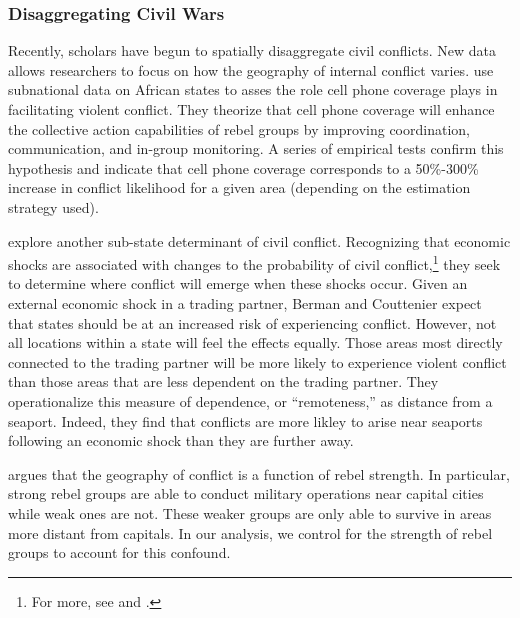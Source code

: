 \subsubsection{Disaggregating Civil Wars}

Recently, scholars have begun to spatially disaggregate civil conflicts. New data allows researchers to focus on how the geography of internal conflict varies. \cite{pierskalla:hollenbach:2013} use subnational data on African states to asses the role cell phone coverage plays in facilitating violent conflict. They theorize that cell phone coverage will enhance the collective action capabilities of rebel groups by improving coordination, communication, and in-group monitoring. A series of empirical tests confirm this hypothesis and indicate that cell phone coverage corresponds to a 50\%-300\% increase in conflict likelihood for a given area (depending on the estimation strategy used).

\cite{berman:couttenier:2013} explore another sub-state determinant of civil conflict. Recognizing that economic shocks are associated with changes to the probability of civil conflict,\footnote{For more, see \cite{miguel:etal:2004} and \cite{dube:vargas:2013}.} they seek to determine where conflict will emerge when these shocks occur. Given an external economic shock in a trading partner, Berman and Couttenier expect that states should be at an increased risk of experiencing conflict. However, not all locations within a state will feel the effects equally. Those areas most directly connected to the trading partner will be more likely to experience violent conflict than those areas that are less dependent on the trading partner. They operationalize this measure of dependence, or ``remoteness,'' as distance from a seaport. Indeed, they find that conflicts are more likley to arise near seaports following an economic shock than they are further away.

\cite{buhaug:2010} argues that the geography of conflict is a function of rebel strength. In particular, strong rebel groups are able to conduct military operations near capital cities while weak ones are not. These weaker groups are only able to survive in areas more distant from capitals. In our analysis, we control for the strength of rebel groups to account for this confound.



